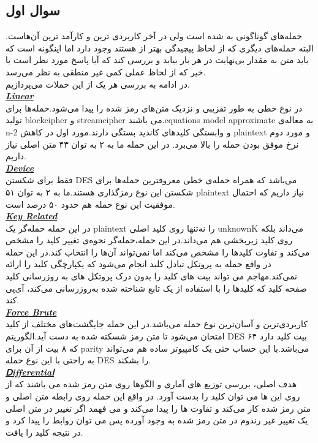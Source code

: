 \subsection{سوال اول}
حمله‌های گوناگونی به 
شده است ولی در آخر 
کاربردی ترین و کارآمد ترین آن‌هاست. البته حمله‌های دیگری که از لحاظ پیچیدگی بهتر از 
هستند وجود دارد اما اینگونه است که باید متن به مقدار بی‌نهایت در هر بار بیابد و بررسی کند که آیا پاسخ مورد نظر است یا خیر که از لحاظ عملی کمی غیر منطقی به نظر می‌رسد.
\\
در ادامه به بررسی هر یک از این حملات می‌پردازیم.
\\
\textit{\textbf{\underline{Linear}}}
\\
در نوع خطی به طور تقزیبی و نزدیک متن‌های رمز شده را پیدا می‌شود.حمله‌ها برای تولید blockcipher و streamcipher می باشند.equations model approximate به معاله‌ی n-2 و وابستگی‌ کلید‌های کاندید بستگی دارند.مورد اول در کاهش plaintext و مورد دوم نرخ موفق بودن حمله را بالا می‌برد. در این حمله ما به ۲ به توان ۴۳ متن اصلی نیاز داریم.
\\
\textit{\textbf{\underline{Device}}}
\\
فقط برای شکستن DES می‌باشد که همراه حمله‌ی خطی معروفترین حمله‌ها برای شکستن این نوع رمز‌گذاری هستند.ما به ۲ به توان ۵۱ plaintext نیاز داریم که احتمال موفقیت این نوع حمله هم حدود ۵۰ درصد است.
\\
\textit{\textbf{\underline{Key Related}}}
\\
در این حمله حمله‌گر یک plaintext را نه‌تنها روی کلید اصلی unknownK می‌داند بلکه روی کلید زیربخشی هم می‌داند.در این حمله،حمله‌گر نحوه‌ی تغییر کلید را مشخص می‌کند و تفاوت کلید‌ها را مشخص می‌کند اما نمی‌تواند آن‌ها را انتخاب کند.در این حمله در واقع حمله به پروتکل تبادل کلید انجام می‌شود که یکپارچگی کلید را ارائه نمی‌کند.مهاجم می تواند بیت های کلید را بدون درک پروتکل های به روزرسانی کلید صفحه کلید که کلیدها را با استفاده از یک تابع شناخته شده به‌روز‌رسانی می‌کند، آی‌پی کند.
\\
\textit{\textbf{\underline{Force Brute}}}
\\
کاربردی‌ترین و آسان‌ترین نوع حمله می‌باشد.در این حمله جایگشت‌های مختلف از کلید امتحان می‌شود تا متن رمز شسکته شده به دست آید.الگوریتم DES ۶۴ بیت کلید دارد که ۸ بیت از آن برای parity می‌باشد.با این حساب حتی یک کامپیوتر ساده هم می‌تواند به راحتی با این نوع حمله DES را بشکند.
\\
\textit{\textbf{\underline{Ⅾifferentiaⅼ}}}
\\
هدف اصلی، بررسی توزیع های آماری و الگو‌ها روی متن رمز شده می باشند که از روی این ها می توان کلید را بدست آورد. در واقع این حمله روی رابطه متن اصلی و متن رمز شده کار می‌کند و تفاوت ها را پیدا می‌کند و می فهمد اگر تغییر در متن اصلی یک تغییر غیر رندوم در متن رمز شده به وجود آورده پس می توان روابط را پیدا کرد و در نتیجه کلید را یافت.
